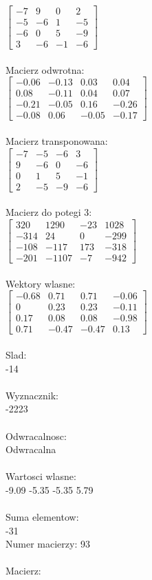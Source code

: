 \documentclass[a4paper,12pt]{article}
\begin{document}
$\begin{bmatrix} -7&9&0&2\\-5&-6&1&-5\\-6&0&5&-9\\3&-6&-1&-6 \end{bmatrix}$
\\
\\
Macierz odwrotna:\\

$\begin{bmatrix} -0.06&-0.13&0.03&0.04\\0.08&-0.11&0.04&0.07\\-0.21&-0.05&0.16&-0.26\\-0.08&0.06&-0.05&-0.17 \end{bmatrix}$
\\
\\
Macierz transponowana:\\

$\begin{bmatrix} -7&-5&-6&3\\9&-6&0&-6\\0&1&5&-1\\2&-5&-9&-6 \end{bmatrix}$
\\
\\
Macierz do potegi 3:\\

$\begin{bmatrix} 320&1290&-23&1028\\-314&24&0&-299\\-108&-117&173&-318\\-201&-1107&-7&-942 \end{bmatrix}$
\\
\\
Wektory wlasne:\\

$\begin{bmatrix} -0.68&0.71&0.71&-0.06\\0&0.23&0.23&-0.11\\0.17&0.08&0.08&-0.98\\0.71&-0.47&-0.47&0.13 \end{bmatrix}$
\\
\\
Slad:\\
-14
\\
\\
Wyznacznik:\\
-2223
\\
\\
Odwracalnosc:\\
Odwracalna
\\
\\
Wartosci wlasne:\\
-9.09 -5.35 -5.35 5.79
\\
\\
Suma elementow:\\
-31
\\
\newpage
Numer macierzy:
93
\\
\\
Macierz:\\
\end{document}
